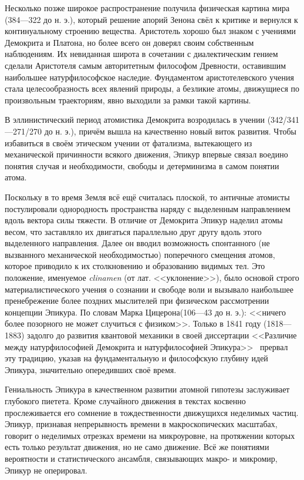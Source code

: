 \documentclass[a4paper, 12pt, oneside]{article} %
\begin{document}
Несколько позже широкое распространение получила физическая картина мира
 (384---322 до н. э.), который решение апорий Зенона
свёл к критике и вернулся к континуальному строению вещества. Аристотель
хорошо был знаком с учениями Демокрита и Платона, но более всего он
доверял своим собственным наблюдениям. Их невиданная широта в сочетании
с диалектическим гением сделали Аристотеля самым авторитетным философом
Древности, оставившим наибольшее натурфилософское наследие. Фундаментом
аристотелевского учения стала целесообразность всех явлений природы, а
безликие атомы, движущиеся по произвольным траекториям, явно выходили за
рамки такой картины.

В эллинистический период атомистика Демокрита возродилась в учении
 (342/341---271/270 до н. э.), причём вышла на
качественно новый виток развития. Чтобы избавиться в своём этическом
учении от фатализма, вытекающего из механической причинности всякого
движения, Эпикур впервые связал воедино понятия случая и необходимости,
свободы и детерминизма в самом понятии атома.

Поскольку в то время Земля всё ещё считалась плоской, то античные
атомисты постулировали однородность пространства наряду с выделенным
направлением вдоль вектора силы тяжести. В отличие от Демокрита Эпикур
наделил атомы весом, что заставляло их двигаться параллельно друг другу
вдоль этого выделенного направления. Далее он вводил возможность
спонтанного (не вызванного механической необходимостью) поперечного
смещения атомов, которое приводило к их столкновению и образованию
видимых тел. Это положение, именуемое \emph{clinamen} (от лат.
<<уклонение>>), было основой строго материалистического учения о
сознании и свободе воли и вызывало наибольшее пренебрежение более
поздних мыслителей при физическом рассмотрении концепции Эпикура. По
словам Марка Цицерона(106---43 до н. э.): <<ничего более позорного не
может случиться с физиком>>. Только в 1841 году 
(1818---1883) задолго до развития квантовой механики в своей диссертации
<<Различие между натурфилософией Демокрита и натурфилософией
Эпикура>>~\cite{marx1956difference} прервал эту традицию, указав на
фундаментальную и философскую глубину идей Эпикура, значительно
опередивших своё время.

Гениальность Эпикура в качественном развитии атомной гипотезы
заслуживает глубокого пиетета. Кроме случайного движения в текстах
косвенно прослеживается его сомнение в тождественности движущихся
неделимых частиц. Эпикур, признавая непрерывность времени в
макроскопических масштабах, говорит о неделимых отрезках времени на
микроуровне, на протяжении которых есть только результат движения, но не
само движение. Всё же понятиями вероятности и статистического ансамбля,
связывающих макро- и микромир, Эпикур не оперировал.
\end{document}
